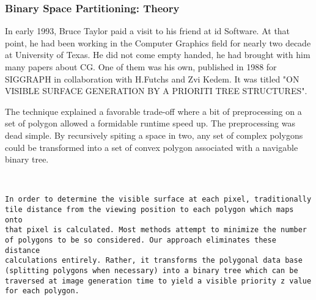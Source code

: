 \subsubsection{Binary Space Partitioning: Theory}
In early 1993, Bruce Taylor paid a visit to his friend at id Software. At that point, he had been working in the Computer Graphics field for nearly two decade at University of Texas. He did not come empty handed, he had brought with him many papers about CG. One of them was his own, published in 1988 for SIGGRAPH in collaboration with H.Futchs and Zvi Kedem. It was titled "ON VISIBLE SURFACE GENERATION BY A PRIORITI TREE STRUCTURES".\\
\par
The technique explained a favorable trade-off where a bit of preprocessing on a set of polygon allowed a formidable runtime speed up. The preprocessing was dead simple. By recursively spiting a space in two, any set of complex polygons could be transformed into a set of convex polygon associated with a navigable binary tree.\\
\par
{}
\par
 \\
 \par

 \begin{verbatim}
In order to determine the visible surface at each pixel, traditionally
tile distance from the viewing position to each polygon which maps onto 
that pixel is calculated. Most methods attempt to minimize the number 
of polygons to be so considered. Our approach eliminates these distance
calculations entirely. Rather, it transforms the polygonal data base 
(splitting polygons when necessary) into a binary tree which can be 
traversed at image generation time to yield a visible priority z value
for each polygon.
\end{verbatim}

\par
{}

